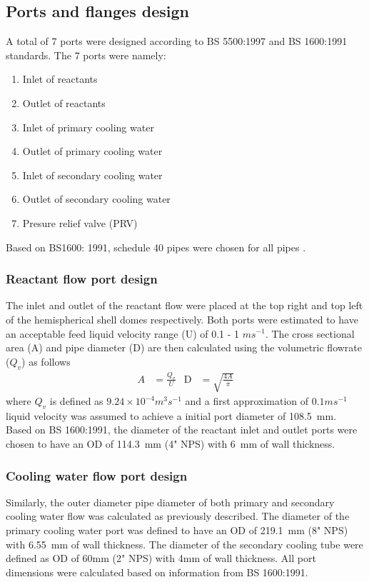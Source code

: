 \subsection{Ports and flanges design}
A total of 7 ports were designed according to BS 5500:1997 and BS 1600:1991 standards. The 7 ports were namely:
\begin{enumerate}
    \item Inlet of reactants
    \item Outlet of reactants
    \item Inlet of primary cooling water
    \item Outlet of primary cooling water
    \item Inlet of secondary cooling water
    \item Outlet of secondary cooling water
    \item Presure relief valve (PRV)
\end{enumerate}
Based on BS1600: 1991, schedule 40 pipes were chosen for all pipes \cite{noauthor_dimensions_nodate}. 
\subsubsection{Reactant flow port design}
The inlet and outlet of the reactant flow were placed at the top right and top left of the hemispherical shell domes respectively. Both ports were estimated to have an acceptable feed liquid velocity range (U) of 0.1 - 1 $ms^{-1}$. The cross sectional area (A) and pipe diameter (D) are then calculated using the volumetric flowrate ($Q_v$) as follows
\begin{align}
    A &= \frac{Q_v}{U} &
    \mathrm{D} &= \sqrt{\frac{4A}{\pi}}
\end{align}
where $Q_v$ is defined as $9.24 \times 10^{-4} m^3s^{-1}$ and a first approximation of $0.1 ms^{-1}$ liquid velocity was assumed to achieve a initial port diameter of \SI{108.5}{\milli \metre}. Based on BS 1600:1991, the diameter of the reactant inlet and outlet ports were chosen to have an OD of \SI{114.3}{\milli \metre} (4" NPS) with \SI{6}{\milli \metre} of wall thickness. 

\subsubsection{Cooling water flow port design}
Similarly, the outer diameter pipe diameter of both primary and secondary cooling water flow was calculated as previously described. The diameter of the primary cooling water port was defined to have an OD of \SI{219.1}{\milli \metre} (8" NPS) with \SI{6.55}{\milli \metre} of wall thickness. The diameter of the secondary cooling tube were defined as OD of 60mm (2" NPS) with 4mm of wall thickness. All port dimensions were calculated based on information from BS 1600:1991. 


